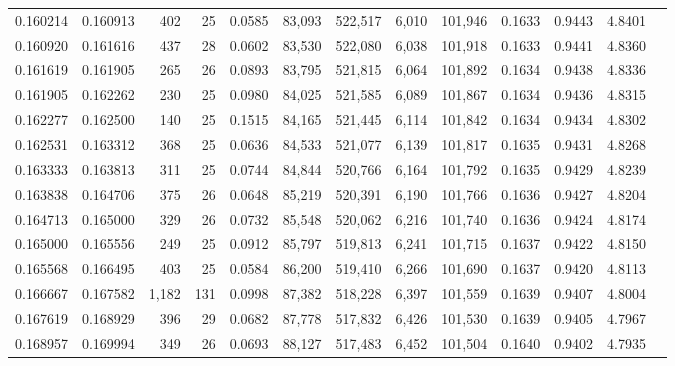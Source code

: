 \begin{tabular}{rrrrrrrrrrrrr}
0.160214 & 0.160913 &    402 &    25 &                                     0.0585 &  83,093 & 522,517 &   6,010 & 101,946 & 0.1633 & 0.9443 & 4.8401 \\
0.160920 & 0.161616 &    437 &    28 &                                     0.0602 &  83,530 & 522,080 &   6,038 & 101,918 & 0.1633 & 0.9441 & 4.8360 \\
0.161619 & 0.161905 &    265 &    26 &                                     0.0893 &  83,795 & 521,815 &   6,064 & 101,892 & 0.1634 & 0.9438 & 4.8336 \\
0.161905 & 0.162262 &    230 &    25 &                                     0.0980 &  84,025 & 521,585 &   6,089 & 101,867 & 0.1634 & 0.9436 & 4.8315 \\
0.162277 & 0.162500 &    140 &    25 &                                     0.1515 &  84,165 & 521,445 &   6,114 & 101,842 & 0.1634 & 0.9434 & 4.8302 \\
0.162531 & 0.163312 &    368 &    25 &                                     0.0636 &  84,533 & 521,077 &   6,139 & 101,817 & 0.1635 & 0.9431 & 4.8268 \\
0.163333 & 0.163813 &    311 &    25 &                                     0.0744 &  84,844 & 520,766 &   6,164 & 101,792 & 0.1635 & 0.9429 & 4.8239 \\
0.163838 & 0.164706 &    375 &    26 &                                     0.0648 &  85,219 & 520,391 &   6,190 & 101,766 & 0.1636 & 0.9427 & 4.8204 \\
0.164713 & 0.165000 &    329 &    26 &                                     0.0732 &  85,548 & 520,062 &   6,216 & 101,740 & 0.1636 & 0.9424 & 4.8174 \\
0.165000 & 0.165556 &    249 &    25 &                                     0.0912 &  85,797 & 519,813 &   6,241 & 101,715 & 0.1637 & 0.9422 & 4.8150 \\
0.165568 & 0.166495 &    403 &    25 &                                     0.0584 &  86,200 & 519,410 &   6,266 & 101,690 & 0.1637 & 0.9420 & 4.8113 \\
0.166667 & 0.167582 &  1,182 &   131 &                                     0.0998 &  87,382 & 518,228 &   6,397 & 101,559 & 0.1639 & 0.9407 & 4.8004 \\
0.167619 & 0.168929 &    396 &    29 &                                     0.0682 &  87,778 & 517,832 &   6,426 & 101,530 & 0.1639 & 0.9405 & 4.7967 \\
0.168957 & 0.169994 &    349 &    26 &                                     0.0693 &  88,127 & 517,483 &   6,452 & 101,504 & 0.1640 & 0.9402 & 4.7935 \\

\end{tabular}
